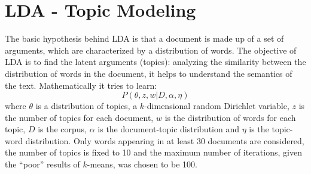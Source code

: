 \documentclass[fleqn,10pt]{SelfArx}
\begin{document}
\section{LDA - Topic Modeling}
The basic hypothesis behind LDA is that a document is made up of a set of arguments, which are characterized by a distribution of words.
The objective of LDA\cite{lda} is to find the latent arguments (topics): analyzing the similarity between the distribution of words in the document, it helps to understand the semantics of the text.
Mathematically it tries to learn:
$$P(\theta, z, w | D, \alpha, \eta)$$
where $\theta$ is a distribution of topics, a $k$-dimensional random Dirichlet variable, $z$ is the number of topics for each document, $w$ is the distribution of words for each topic, $D$ is the corpus, $\alpha$ is the document-topic distribution and $\eta$ is the topic-word distribution.
Only words appearing in at least 30 documents are considered, the number of topics is fixed to 10 and the maximum number of iterations, given the ``poor'' results of $k$-means, was chosen to be 100.
\end{document}
